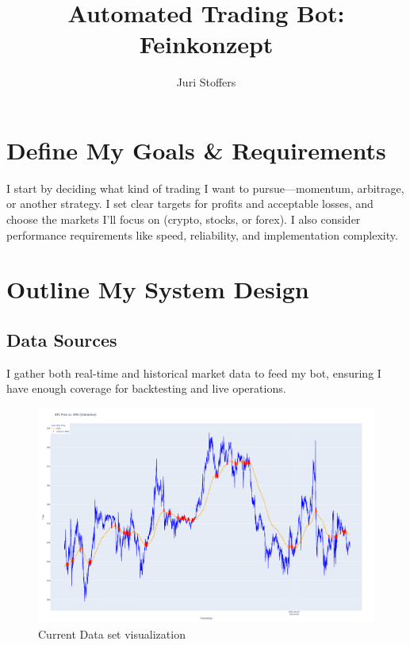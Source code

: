 \documentclass[9pt,a4paper,twocolumn,twoside]{tau-class/tau}
\title{Automated Trading Bot: Feinkonzept}
\author[a,1]{Juri Stoffers}
\affil[a]{Gymthun}
\begin{document}
\maketitle
\thispagestyle{firststyle}


\section{Define My Goals \& Requirements}

\taustart{} I start by deciding what kind of trading I want to pursue—momentum, 
arbitrage, or another strategy. I set clear targets for profits and acceptable 
losses, and choose the markets I'll focus on (crypto, stocks, or forex). 
I also consider performance requirements like speed, reliability, and 
implementation complexity.

\section{Outline My System Design}

\subsection{Data Sources}
I gather both real-time and historical market data to feed my bot, ensuring 
I have enough coverage for backtesting and live operations.

\begin{figure}[H]
    \centering
    \includegraphics[width=0.85\columnwidth]{figures/newplot.png}
    \caption{Current Data set visualization}
    \label{fig:Dataset}
\end{figure}
\end{document}
